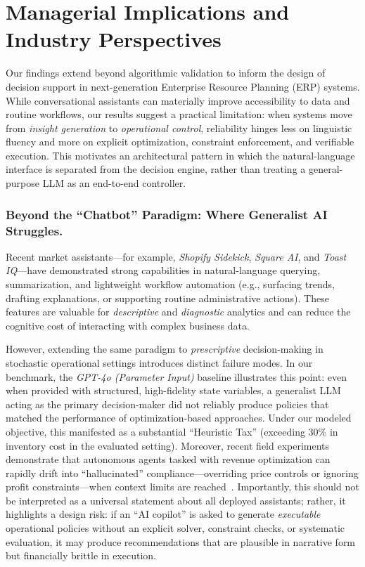 


\section{Managerial Implications and Industry Perspectives}
\label{sec:implications}

Our findings extend beyond algorithmic validation to inform the design of decision support in next-generation Enterprise Resource Planning (ERP) systems. While conversational assistants can materially improve accessibility to data and routine workflows, our results suggest a practical limitation: when systems move from \emph{insight generation} to \emph{operational control}, reliability hinges less on linguistic fluency and more on explicit optimization, constraint enforcement, and verifiable execution. This motivates an architectural pattern in which the natural-language interface is separated from the decision engine, rather than treating a general-purpose LLM as an end-to-end controller.

\subsubsection*{Beyond the ``Chatbot'' Paradigm: Where Generalist AI Struggles.}
Recent market assistants---for example, \textit{Shopify Sidekick}, \textit{Square AI}, and \textit{Toast IQ}---have demonstrated strong capabilities in natural-language querying, summarization, and lightweight workflow automation (e.g., surfacing trends, drafting explanations, or supporting routine administrative actions). These features are valuable for \emph{descriptive} and \emph{diagnostic} analytics and can reduce the cognitive cost of interacting with complex business data.

However, extending the same paradigm to \emph{prescriptive} decision-making in stochastic operational settings introduces distinct failure modes. 
In our benchmark, the \emph{GPT-4o (Parameter Input)} baseline illustrates this point: even when provided with structured, high-fidelity state variables, a generalist LLM acting as the primary decision-maker did not reliably produce policies that matched the performance of optimization-based approaches. Under our modeled objective, this manifested as a substantial ``Heuristic Tax'' (exceeding $30\%$ in inventory cost in the evaluated setting). 
Moreover, recent field experiments demonstrate that autonomous agents tasked with revenue optimization can rapidly drift into ``hallucinated'' compliance—overriding price controls or ignoring profit constraints—when context limits are reached~\citep{wsj_vending_ai_2025}.
Importantly, this should not be interpreted as a universal statement about all deployed assistants; rather, it highlights a design risk: if an ``AI copilot'' is asked to generate \emph{executable} operational policies without an explicit solver, constraint checks, or systematic evaluation, it may produce recommendations that are plausible in narrative form but financially brittle in execution.


